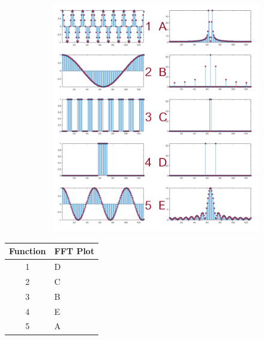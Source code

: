 \documentclass[12pt, oneside]{article}
\begin{document}
\begin{figure}[H]
    \centering
    \begin{subfigure}[b]{1\textwidth}
        \centering
        \includegraphics[width=\textwidth]{imgs/q5_matching.png}
    \end{subfigure}
    \caption{}
\end{figure}

\begin{table}[H]
    \centering
    \begin{tabular}{|c|l|}
    \hline
    \multicolumn{1}{|l|}{\textbf{Function}} & \textbf{FFT Plot} \\ \hline
    1                                       & D                 \\ \hline
    2                                       & C                 \\ \hline
    3                                       & B                 \\ \hline
    4                                       & E                 \\ \hline
    5                                       & A                 \\ \hline
    \end{tabular}
\end{table}
\end{document}
